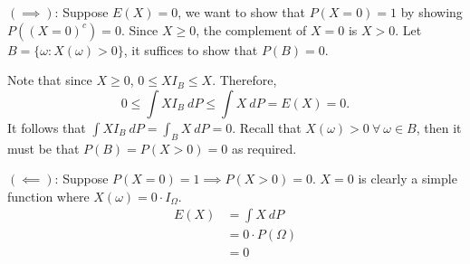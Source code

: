 \documentclass[12pt]{article}
\begin{document}
\begin{problem}[3]
	$ (\implies)$: Suppose $ E(X) =0$, we want to show that  $ P(X=0)= 1$ by showing $ P((X=0)^{c})=0$. Since $ X\geq 0$, the complement of  $ X=0$ is  $ X>0$. Let  $ B = \{\omega: X(\omega) > 0\} $, it suffices to show that $ P(B) = 0$.

	Note that since $ X\geq 0$, $ 0\leq X I_B \leq X$. Therefore,
	\[
		0 \leq \int X I_B\ dP \leq \int X\ dP = E(X) = 0
	.\]
	It follows that $ \int X I_B\ dP = \int_B X\ dP = 0$. Recall that  $ X(\omega) >0 \ \forall \ \omega \in B$, then it must be that $ P(B) = P(X>0) = 0$ as required.

	$ (\impliedby)$: Suppose $ P(X=0)=1 \implies P(X > 0) = 0$. $ X=0$ is clearly a simple function where  $ X(\omega) = 0 \cdot I_{\Omega}$. 
	\begin{align*}
		E(X) &= \int X\ dP \\
		     &= 0 \cdot  P(\Omega)\\
		&= 0 \\
	\end{align*}
\end{problem}
\end{document}
